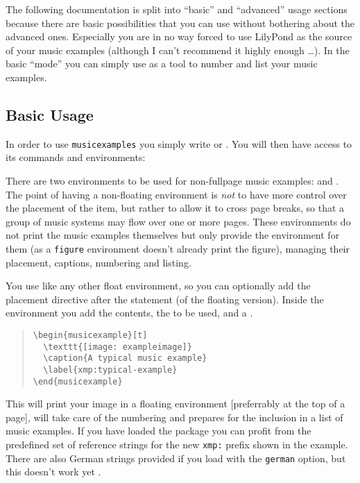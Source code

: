\documentclass[../openLilyLib]{subfiles}
\begin{document}
The following documentation is split into “basic” and “advanced” usage sections because there are basic possibilities that you can use without bothering about the advanced ones.
Especially you are in no way forced to use LilyPond as the source of your music examples (although I can't recommend it highly enough \dots).
In the basic “mode” you can simply use  as a tool to number and list your music examples.

\subsection{Basic Usage}
\label{subsec:xmp_basic-usage}
In order to use \texttt{musicexamples} you simply write  or .
You will then have access to its commands and environments:

There are two environments to be used for non-fullpage music examples:  and .
The point of having a non-floating environment is \emph{not} to have more control over the placement of the item, but rather to allow it to cross page breaks, so that a group of music systems may flow over one or more pages. 
These environments do not print the music examples themselves but only provide the environment for them (as a \texttt{figure} environment doesn't already print the figure), managing their placement, captions, numbering and listing.

You use  like any other float environment, so you can optionally add the placement directive after the  statement (of the floating version).
Inside the environment you add the contents, the  to be used, and a .
\begin{quote}
\begin{verbatim}
\begin{musicexample}[t]
  \texttt{[image: exampleimage]}
  \caption{A typical music example}
  \label{xmp:typical-example}
\end{musicexample}
\end{verbatim}
\end{quote}

This will print your image in a floating environment [preferrably at the top of a page], will take care of the numbering and prepares for the inclusion in a list of music examples.
If you have loaded the  package you can profit from the predefined set of reference strings for the new \texttt{xmp:} prefix shown in the example.
There are also German strings provided if you load  with the \texttt{german} option, but this doesn't work yet .
\end{document}
